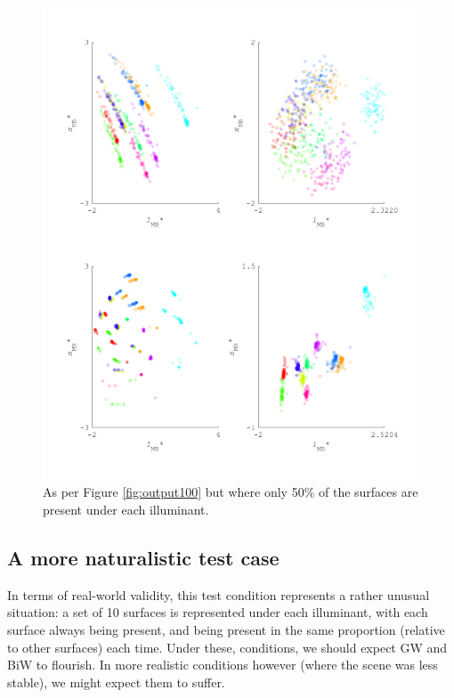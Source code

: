 \begin{figure}[htbp] %
\centerline{\includegraphics[max width=1.2\textwidth]{figs/comp/comparisonFourAlgos/output50.pdf}}
 \caption{As per Figure \ref{fig:output100} but where only 50\% of the surfaces are present under each illuminant.}
 \label{fig:output50}
\end{figure} 


\subsection{A more naturalistic test case}

In terms of real-world validity, this test condition represents a rather unusual situation: a set of 10 surfaces is represented under each illuminant, with each surface always being present, and being present in the same proportion (relative to other surfaces) each time. Under these, conditions, we should expect \gls{GW} and \gls{BiW} to flourish. In more realistic conditions however (where the scene was less stable), we might expect them to suffer.

